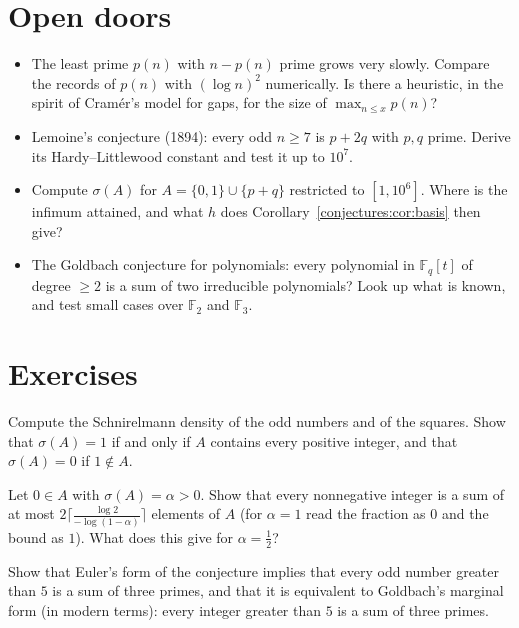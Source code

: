 \section{Open doors}

\begin{itemize}
\item The least prime $p(n)$ with $n-p(n)$ prime grows very slowly. Compare the records of $p(n)$ with $(\log n)^2$ numerically. Is there a heuristic,
in the spirit of Cram\'er's model for gaps, for the size of $\max_{n\le x}p(n)$?
\item Lemoine's conjecture (1894): every odd $n\ge7$ is $p+2q$ with $p,q$ prime. Derive its Hardy--Littlewood constant and test it up to $10^7$.
\item Compute $\sigma(A)$ for $A=\{0,1\}\cup\{p+q\}$ restricted to $[1,10^6]$. Where is the infimum attained, and what $h$ does Corollary~\ref{conjectures:cor:basis}
then give?
\item The Goldbach conjecture for polynomials: every polynomial in $\mathbb F_q[t]$ of degree $\ge2$ is a sum of two irreducible polynomials? Look up
what is known, and test small cases over $\mathbb F_2$ and $\mathbb F_3$.
\end{itemize}

\section{Exercises}

\begin{exercise}[$\star$]\label{conjectures:ex:sdensity}
Compute the Schnirelmann density of the odd numbers and of the squares. Show that $\sigma(A)=1$ if and only if $A$ contains every positive integer, and
that $\sigma(A)=0$ if $1\notin A$.
\end{exercise}

\begin{exercise}[$\star\star$]\label{conjectures:ex:basisorder}
Let $0\in A$ with $\sigma(A)=\alpha>0$. Show that every nonnegative integer is a sum of at most $2\bigl\lceil\frac{\log2}{-\log(1-\alpha)}\bigr\rceil$ elements
of $A$ (for $\alpha=1$ read the fraction as $0$ and the bound as $1$). What does this give for $\alpha=\frac12$?
\end{exercise}

\begin{exercise}[$\star$]\label{conjectures:ex:goldbachforms}
Show that Euler's form of the conjecture implies that every odd number greater than $5$ is a sum of three primes, and that it is equivalent to
Goldbach's marginal form (in modern terms): every integer greater than $5$ is a sum of three primes.
\end{exercise}

